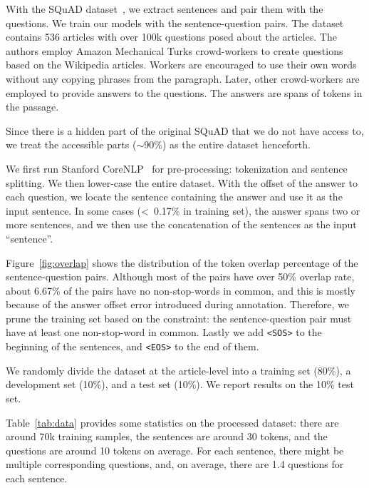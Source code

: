 \documentclass[11pt,a4paper]{article}
\begin{document}
With the SQuAD dataset~\cite{rajpurkar2016squad}, we extract sentences and pair them with the questions. We train our models with the sentence-question pairs. The dataset contains 536 articles with over 100k questions posed about the articles. The authors employ Amazon Mechanical Turks crowd-workers to create questions based on the Wikipedia articles. Workers are encouraged to use their own words without any copying phrases from the paragraph. Later, other crowd-workers are employed to provide answers to the questions. The answers are spans of tokens in the passage.

Since there is a hidden part of the original SQuAD that we do not have access to, we treat the accessible parts ($\sim$90\%) as the entire dataset henceforth. 

 We first run Stanford CoreNLP~\cite{manning2014corenlp} for pre-processing: tokenization and sentence splitting. We then lower-case the entire dataset. With the offset of the answer to each question, we locate the sentence containing the answer and use it as the input sentence. In some cases (<~0.17\% in training set), the answer spans two or more sentences, and we then use the concatenation of the sentences as the input ``sentence''.

 Figure~\ref{fig:overlap} shows the distribution of the token overlap percentage of the sentence-question pairs. Although most of the pairs have over 50\% overlap rate, about 6.67\% of the pairs have no non-stop-words in common, and this is mostly because of the answer offset error introduced during annotation. Therefore, we prune the training set based on the constraint: the sentence-question pair must have at least one non-stop-word in common. Lastly we add \verb|<SOS>| to the beginning of the sentences, and \verb|<EOS>| to the end of them.

We randomly divide the dataset at the article-level into a training set (80\%), a development set (10\%), and a test set (10\%). We report results on the 10\% test set.

Table~\ref{tab:data} provides some statistics on the processed dataset: there are around 70k training samples, the sentences are around 30 tokens, and the questions are around 10 tokens on average. For each sentence, there might be multiple corresponding questions, and, on average, there are 1.4 questions for each sentence.
\end{document}
